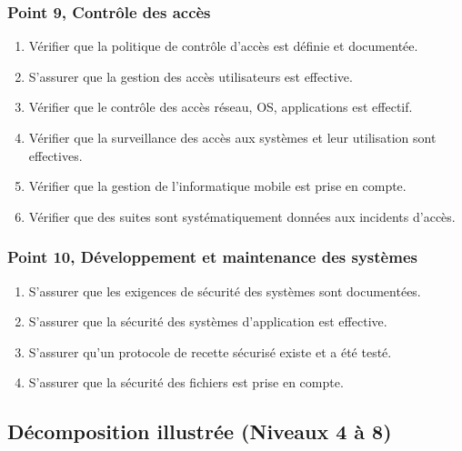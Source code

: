 \subsubsection{Point 9, Contrôle des accès}
\begin{enumerate}[label=9.\arabic*.]
    \item Vérifier que la politique de contrôle d'accès est définie et documentée.
    \item S'assurer que la gestion des accès utilisateurs est effective.
    \item Vérifier que le contrôle des accès réseau, OS, applications est effectif.
    \item Vérifier que la surveillance des accès aux systèmes et leur utilisation sont effectives.
    \item Vérifier que la gestion de l'informatique mobile est prise en compte.
    \item Vérifier que des suites sont systématiquement données aux incidents d'accès.
\end{enumerate}

\subsubsection{Point 10, Développement et maintenance des systèmes}
\begin{enumerate}[label=10.\arabic*.]
    \item S'assurer que les exigences de sécurité des systèmes sont documentées.
    \item S'assurer que la sécurité des systèmes d'application est effective.
    \item S'assurer qu'un protocole de recette sécurisé existe et a été testé.
    \item S'assurer que la sécurité des fichiers est prise en compte.
\end{enumerate}

\subsection{Décomposition illustrée (Niveaux 4 à 8)}


